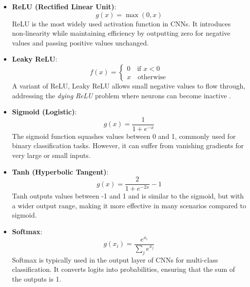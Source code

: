 \begin{itemize}
    \item \textbf{ReLU (Rectified Linear Unit)}: \label{theoretical_activations_relu}
    \begin{equation}
    g(x) = \max(0, x)
    \end{equation}
    ReLU is the most widely used activation function in CNNs. It introduces non-linearity while maintaining efficiency by outputting zero for negative values and passing positive values unchanged.

    \item \textbf{Leaky ReLU}: \label{theoretical_activations_leakyrelu}
    \begin{equation}
        f(x) =
        \begin{cases}
        0 \quad \text{if } x < 0 \\
        x \quad \text{otherwise}
        \end{cases}
    \end{equation}
    A variant of ReLU, Leaky ReLU allows small negative values to flow through, addressing the \textit{dying ReLU} problem where neurons can become inactive \cite{Lu_Lu_2020}. 

    \item \textbf{Sigmoid (Logistic)}:  \label{theoretical_activations_sigmoid}
    \begin{equation}
        g(x) = \frac{1}{1 + e^{-x}}
    \end{equation}
    The sigmoid function squashes values between 0 and 1, commonly used for binary classification tasks. However, it can suffer from vanishing gradients for very large or small inputs.

    \item \textbf{Tanh (Hyperbolic Tangent)}:  \label{theoretical_activations_tanh}
    \begin{equation}
        g(x) = \frac{2}{1 + e^{-2x}} - 1
    \end{equation}
    Tanh outputs values between -1 and 1 and is similar to the sigmoid, but with a wider output range, making it more effective in many scenarios compared to sigmoid.

    \item \textbf{Softmax}: \label{theoretical_activations_softmax}
    \begin{equation}
        g(x_i) = \frac{e^{x_i}}{\sum_{j} e^{x_j}}
    \end{equation}
    Softmax is typically used in the output layer of CNNs for multi-class classification. It converts logits into probabilities, ensuring that the sum of the outputs is 1.


\end{itemize}
